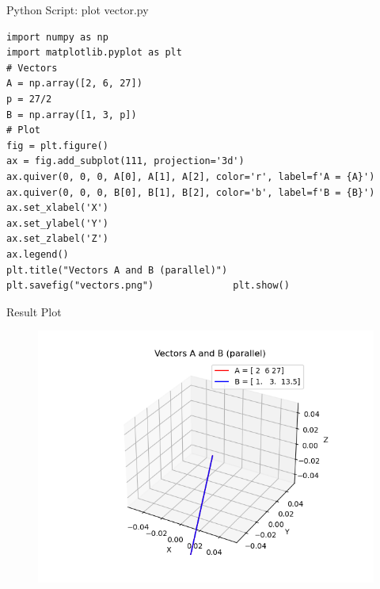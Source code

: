 \documentclass{beamer}
\numberwithin{equation}{section}
\theoremstyle{remark}
\begin{document}

\begin{frame}[fragile]{Python Script: plot vector.py}
\begin{verbatim}
import numpy as np
import matplotlib.pyplot as plt
# Vectors
A = np.array([2, 6, 27])
p = 27/2
B = np.array([1, 3, p])
# Plot
fig = plt.figure()
ax = fig.add_subplot(111, projection='3d')
ax.quiver(0, 0, 0, A[0], A[1], A[2], color='r', label=f'A = {A}')
ax.quiver(0, 0, 0, B[0], B[1], B[2], color='b', label=f'B = {B}')
ax.set_xlabel('X')
ax.set_ylabel('Y')
ax.set_zlabel('Z')
ax.legend()
plt.title("Vectors A and B (parallel)")
plt.savefig("vectors.png")              plt.show()

\end{verbatim}
\end{frame}

\begin{frame}{Result Plot}
 \begin{figure}[H]
     \centering
     \includegraphics[width=0.5\columnwidth]{figs/fig1.png}
     \caption*{}
     \label{fig:fig1}
 \end{figure}
 
\end{frame}
\end{document}
